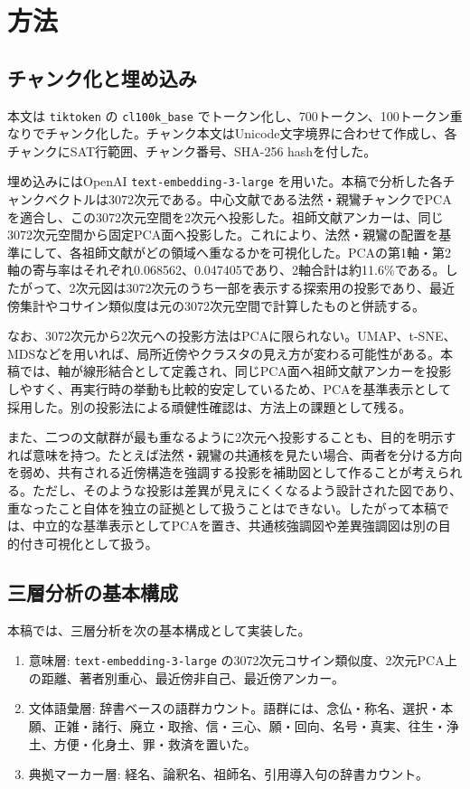 \documentclass[uplatex,dvipdfmx,11pt,a4paper]{jsarticle}
\begin{document}
\section{方法}

\subsection{チャンク化と埋め込み}

本文は \texttt{tiktoken} の \texttt{cl100k\_base} でトークン化し、700トークン、100トークン重なりでチャンク化した\cite{tiktoken}。チャンク本文はUnicode文字境界に合わせて作成し、各チャンクにSAT行範囲、チャンク番号、SHA-256 hashを付した。

埋め込みにはOpenAI \texttt{text-embedding-3-large} を用いた\cite{openai-embeddings}。本稿で分析した各チャンクベクトルは3072次元である。中心文献である法然・親鸞チャンクでPCAを適合し、この3072次元空間を2次元へ投影した。祖師文献アンカーは、同じ3072次元空間から固定PCA面へ投影した。これにより、法然・親鸞の配置を基準にして、各祖師文献がどの領域へ重なるかを可視化した。PCAの第1軸・第2軸の寄与率はそれぞれ0.068562、0.047405であり、2軸合計は約11.6\%である。したがって、2次元図は3072次元のうち一部を表示する探索用の投影であり、最近傍集計やコサイン類似度は元の3072次元空間で計算したものと併読する。

なお、3072次元から2次元への投影方法はPCAに限られない。UMAP、t-SNE、MDSなどを用いれば、局所近傍やクラスタの見え方が変わる可能性がある。本稿では、軸が線形結合として定義され、同じPCA面へ祖師文献アンカーを投影しやすく、再実行時の挙動も比較的安定しているため、PCAを基準表示として採用した。別の投影法による頑健性確認は、方法上の課題として残る。

また、二つの文献群が最も重なるように2次元へ投影することも、目的を明示すれば意味を持つ。たとえば法然・親鸞の共通核を見たい場合、両者を分ける方向を弱め、共有される近傍構造を強調する投影を補助図として作ることが考えられる。ただし、そのような投影は差異が見えにくくなるよう設計された図であり、重なったこと自体を独立の証拠として扱うことはできない。したがって本稿では、中立的な基準表示としてPCAを置き、共通核強調図や差異強調図は別の目的付き可視化として扱う。

\subsection{三層分析の基本構成}

本稿では、三層分析を次の基本構成として実装した。

\begin{enumerate}
  \item 意味層: \texttt{text-embedding-3-large} の3072次元コサイン類似度、2次元PCA上の距離、著者別重心、最近傍非自己、最近傍アンカー。
  \item 文体語彙層: 辞書ベースの語群カウント。語群には、念仏・称名、選択・本願、正雑・諸行、廃立・取捨、信・三心、願・回向、名号・真実、往生・浄土、方便・化身土、罪・救済を置いた。
  \item 典拠マーカー層: 経名、論釈名、祖師名、引用導入句の辞書カウント。
\end{enumerate}
\end{document}
